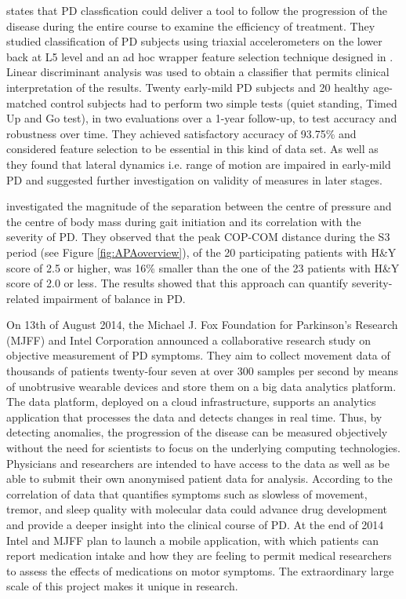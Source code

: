 \citeauthor{palmerini_classification_2013} \cite{palmerini_classification_2013} states that PD classfication could deliver a tool to follow the progression of the disease during the entire course to examine the efficiency of treatment. They studied classification of PD subjects  using triaxial accelerometers on the lower back at L5 level and an ad hoc wrapper feature selection technique designed in \cite{palmerini_quantification_2013}. Linear discriminant analysis was used to obtain a classifier that permits clinical interpretation of the results. Twenty early-mild PD subjects and 20 healthy age-matched control subjects had to perform two simple tests (quiet standing, Timed Up and Go test), in two evaluations over a 1-year follow-up, to test accuracy and robustness over time. They achieved satisfactory accuracy of 93.75\% and considered feature selection to be essential in this kind of data set. As well as \cite{mancini_anticipatory_2009} they found that lateral dynamics i.e. range of motion are impaired in early-mild PD and suggested further investigation on validity of measures in later stages.

\citeauthor{hass_gait_2005-1} \cite{hass_gait_2005-1} investigated the magnitude of the separation between the centre of pressure and the centre of body mass during gait initiation and its correlation with the severity of PD. They observed that the peak COP-COM distance during the S3 period (see Figure \ref{fig:APAoverview}), of the 20 participating patients with H\&Y score of 2.5 or higher, was 16\% smaller than the one of the 23 patients with H\&Y score of 2.0 or less. The results showed that this approach can quantify severity-related impairment of balance in PD.

On 13th of August 2014, the Michael J. Fox Foundation for Parkinson’s Research (MJFF) and Intel Corporation \cite{Intel_2013} announced a collaborative research study on objective measurement of PD symptoms. They aim to collect movement data of thousands of patients twenty-four seven at over 300 samples per second by means of unobtrusive wearable devices and store them on a big data analytics platform. The data platform, deployed on a cloud infrastructure, supports an analytics application that processes the data and detects changes in real time. Thus, by detecting anomalies, the progression of the disease can be measured objectively without the need for scientists to focus on the underlying computing technologies. Physicians and researchers are intended to have access to the data as well as be able to submit their own anonymised patient data for analysis. According to \cite{Intel_2013} the correlation of data that quantifies symptoms such as slowless of movement, tremor, and sleep quality with molecular data could advance drug development and provide a deeper insight into the clinical course of PD. At the end of 2014 Intel and MJFF plan to launch a mobile application, with which patients can report medication intake and how they are feeling to permit medical researchers to assess the effects of medications on motor symptoms. The extraordinary large scale of this project makes it unique in research.

